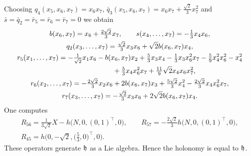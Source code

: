 \documentclass[pdftex]{sigma}
\numberwithin{equation}{section}
\newcommand\fh{{\frak h}}
\begin{document}
\begin{Example} Choosing $q_4(x_5,x_6,x_7)=x_6 x_7$, $\bar q_3(x_5,x_6,x_7)=x_6 x_7+\frac {\sqrt2}3 x_7^2$ and $\bar s=\bar q_2=\bar r_5 =\bar r_6 =\bar r_7=0$ we obtain
\begin{gather*}
b(x_6,x_7) = x_6+\tfrac{2\sqrt2}3 x_7,\qquad
s(x_4,\dots,x_7)= -\tfrac13 x_4x_6,\\
q_2(x_3,\dots,x_7)= \tfrac{ \sqrt2}3 x_3 x_6 +\sqrt2 b(x_6,x_7)x_4 ,\\
r_5(x_1,\dots,x_7)= -\tfrac1{\sqrt2} x_1 x_6-b(x_6 ,x_7)x_2 +\tfrac 53 x_3 x_4 -\tfrac 13 x_3 x_6^2 x_7-\tfrac59 x_4^2 x_6^2 -x_4^2 \\
\hphantom{r_5(x_1,\dots,x_7)=}{} +\tfrac 53 x_4 x_6^2 x_7 +\tfrac {11}9 \sqrt2 x_4 x_6 x_7^2,\\
r_6(x_2,\dots,x_7)= -\tfrac{2\sqrt2}3x_2 x_6 +2b(x_6, x_7)x_3 +\tfrac {5\sqrt2}3 x_4^2 -\tfrac{2\sqrt2}3x_4 x_6^2 x_7, \\
r_7(x_3,\dots,x_7)= -\tfrac{\sqrt2}3 x_3 x_6 +2\sqrt2 b(x_6, x_7) x_4.
\end{gather*}
One computes
\begin{gather*} R_{56}=\tfrac 1{3\sqrt2} X-h\big(N,0,(0,1)^\top,0\big),\qquad R_{57}=-\tfrac{2\sqrt2}3 h\big(N,0,(0,1)^\top,0\big),\\ R_{45}=h\big(0,-\sqrt2,\big(\tfrac53,0\big)^\top,0\big). \end{gather*}
These operators generate $\fh$ as a Lie algebra. Hence the holonomy is equal to $\fh$.
\end{Example}
\end{document}
